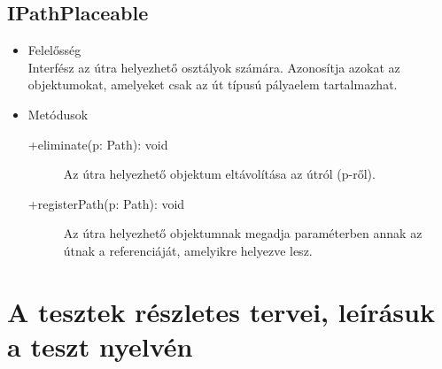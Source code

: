 \subsection{IPathPlaceable}
\begin{itemize}
\item Felelősség\\
Interfész az útra helyezhető osztályok számára. Azonosítja azokat az objektumokat, amelyeket csak az út típusú pályaelem tartalmazhat.

\item Metódusok
	\begin{description}
		\item[+eliminate(p: Path): void] Az útra helyezhető objektum eltávolítása az útról (p-ről). 
\item[+registerPath(p: Path): void] Az útra helyezhető objektumnak megadja paraméterben annak az útnak a referenciáját, amelyikre helyezve lesz. 

	\end{description}
\end{itemize}

\lstset{escapeinside=`', xleftmargin=10pt, frame=single, basicstyle=\ttfamily\footnotesize, language=sh}


\section{A tesztek részletes tervei, leírásuk a teszt nyelvén}

